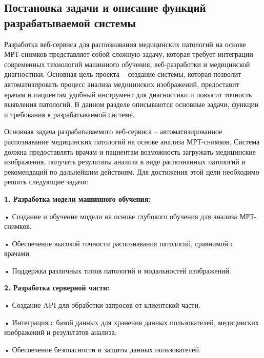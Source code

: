 \subtitlespace

\subsection*{ 
  \gostTitleFont
   Постановка задачи и описание функций разрабатываемой системы 
} 

\subtitlespace

{\gostFont

  \par \redline Разработка веб-сервиса для распознавания медицинских патологий на основе МРТ-снимков представляет собой сложную задачу, которая требует интеграции современных технологий машинного обучения, веб-разработки и медицинской диагностики. Основная цель проекта – создание системы, которая позволит автоматизировать процесс анализа медицинских изображений, предоставит врачам и пациентам удобный инструмент для диагностики и повысит точность выявления патологий. В данном разделе описываются основные задачи, функции и требования к разрабатываемой системе.

  \par \redline Основная задача разрабатываемого веб-сервиса – автоматизированное распознавание медицинских патологий на основе анализа МРТ-снимков. Система должна предоставлять врачам и пациентам возможность загружать медицинские изображения, получать результаты анализа в виде распознанных патологий и рекомендаций по дальнейшим действиям. Для достижения этой цели необходимо решить следующие задачи:

  \par \redline \textbf{1. Разработка модели машинного обучения:}
  \par \redline \hspace{0.3cm} • Создание и обучение модели на основе глубокого обучения для анализа МРТ-снимков.
  \par \redline \hspace{0.3cm} • Обеспечение высокой точности распознавания патологий, сравнимой с врачами.
  \par \redline \hspace{0.3cm} • Поддержка различных типов патологий и модальностей изображений.

  \par \redline \textbf{2. Разработка серверной части:}
  \par \redline \hspace{0.3cm} • Создание API для обработки запросов от клиентской части.
  \par \redline \hspace{0.3cm} • Интеграция с базой данных для хранения данных пользователей, медицинских изображений и результатов анализа.
  \par \redline \hspace{0.3cm} • Обеспечение безопасности и защиты данных пользователей.

}
